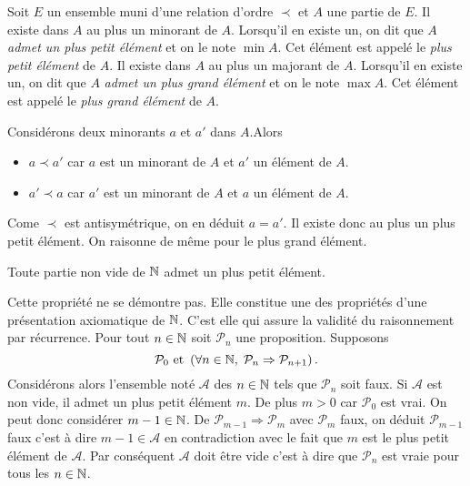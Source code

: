  
\begin{propdef}
  Soit $E$ un ensemble muni d'une relation d'ordre $\prec$ et $A$ une partie de $E$.\newline
Il existe dans $A$ au plus un minorant de $A$. Lorsqu'il en existe un, on dit que $A$ \emph{admet un plus petit élément} et on le note $\min A$. Cet élément est appelé le \emph{plus petit élément} de $A$.\newline
Il existe dans $A$ au plus un majorant de $A$. Lorsqu'il en existe un, on dit que $A$ \emph{admet un plus grand élément} et on le note $\max A$. Cet élément est appelé le \emph{plus grand élément} de $A$.
\end{propdef}
\begin{demo}
Considérons deux minorants $a$ et $a'$ dans $A$.Alors
\begin{itemize}
 \item $a \prec a'$ car $a$ est un minorant de $A$ et $a'$ un élément de $A$.
 \item $a' \prec a$ car $a'$ est un minorant de $A$ et $a$ un élément de $A$.
\end{itemize}
Come $\prec$ est antisymétrique, on en déduit $a=a'$. Il existe donc au plus un plus petit élément. \newline
On raisonne de même pour le plus grand élément.
\end{demo}

\begin{prop}
  Toute partie non vide de $\mathbb{N}$ admet un plus petit élément.
\end{prop}
Cette propriété ne se démontre pas. Elle constitue une des propriétés d'une présentation axiomatique de $\mathbb{N}$. C'est elle qui assure la validité du raisonnement par  récurrence. \newline
Pour tout $n\in \mathbb{N}$ soit $\mathcal{P}_n$ une proposition. Supposons  
\[
  \mathcal{P}_0 \text{ et } \left( \forall n \in \mathbb{N}, \; \mathcal{P}_n \Rightarrow \mathcal{P}_{n+1}\right).
\]
Considérons alors l'ensemble noté $\mathcal{A}$ des $n\in \mathbb{N}$ tels que $\mathcal{P}_n$ soit faux. Si $\mathcal{A}$ est non vide, il admet un plus petit élément $m$. De plus $m> 0$ car $\mathcal{P}_0$ est vrai. On peut donc considérer $m-1 \in \mathbb{N}$. De $\mathcal{P}_{m-1} \Rightarrow \mathcal{P}_m$ avec $\mathcal{P}_m$ faux, on déduit $\mathcal{P}_{m-1}$ faux c'est à dire $m-1 \in \mathcal{A}$ en contradiction avec le fait que $m$ est le plus petit élément de $\mathcal{A}$. Par conséquent $\mathcal{A}$ doit être vide c'est à dire que $\mathcal{P}_n$ est vraie pour tous les $n\in \mathbb{N}$.


